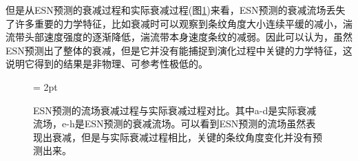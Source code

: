 但是从ESN预测的衰减过程和实际衰减过程(图\ref{fig:esn_decay})来看，ESN预测的衰减流场丢失了许多重要的力学特征，比如衰减时可以观察到条纹角度大小连续平缓的减小，湍流带头部速度强度的逐渐降低，湍流带本身速度条纹的减弱。因此可以认为，虽然ESN预测出了整体的衰减，但是它并没有能捕捉到演化过程中关键的力学特征，这说明它得到的结果是非物理、可参考性极低的。
\begin{figure}[H]
	\subfigbottomskip = 2pt
	\begin{minipage}[h]{0.22\linewidth}
	\centering
	\end{minipage}
	\quad
	\begin{minipage}[h]{0.22\linewidth}
	\centering
	\end{minipage}
	\quad
	\begin{minipage}[h]{0.22\linewidth}
	\centering
	\end{minipage}
	\quad
	\begin{minipage}[h]{0.22\linewidth}
	\centering
	\end{minipage}
	\quad
	\begin{minipage}[h]{0.22\linewidth}
	\centering
	\end{minipage}
	\quad
	\begin{minipage}[h]{0.22\linewidth}
	\centering
	\end{minipage}
	\quad
	\begin{minipage}[h]{0.22\linewidth}
	\centering
	\end{minipage}
	\quad
	\begin{minipage}[h]{0.22\linewidth}
	\centering
	\end{minipage}
	\quad
	\caption{ESN预测的流场衰减过程与实际衰减过程对比。其中a-d是实际衰减流场，e-h是ESN预测的衰减流场。可以看到ESN预测的流场虽然表现出衰减，但是与实际衰减过程相比，关键的条纹角度变化并没有预测出来。}
\label{fig:esn_decay}
\end{figure}

